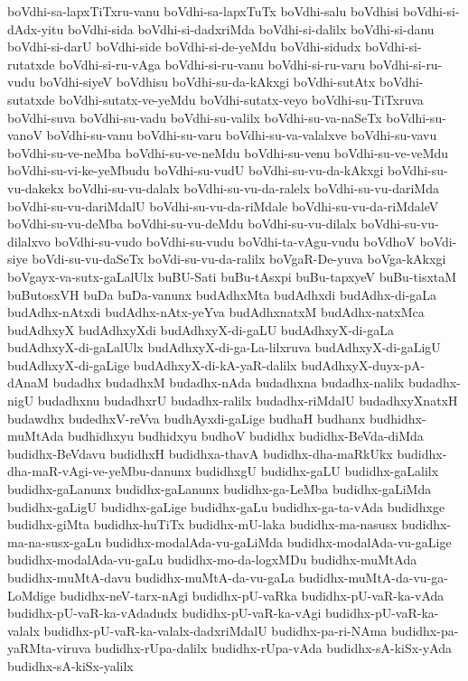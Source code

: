 {boVdhi-sa-lapxTiTxru-vanu
boVdhi-sa-lapxTuTx
boVdhi-salu
boVdhisi
boVdhi-si-dAdx-yitu
boVdhi-sida
boVdhi-si-dadxriMda
boVdhi-si-dalilx
boVdhi-si-danu
boVdhi-si-darU
boVdhi-side
boVdhi-si-de-yeMdu
boVdhi-sidudx
boVdhi-si-rutatxde
boVdhi-si-ru-vAga
boVdhi-si-ru-vanu
boVdhi-si-ru-varu
boVdhi-si-ru-vudu
boVdhi-siyeV
boVdhisu
boVdhi-su-da-kAkxgi
boVdhi-sutAtx
boVdhi-sutatxde
boVdhi-sutatx-ve-yeMdu
boVdhi-sutatx-veyo
boVdhi-su-TiTxruva
boVdhi-suva
boVdhi-su-vadu
boVdhi-su-valilx
boVdhi-su-va-naSeTx
boVdhi-su-vanoV
boVdhi-su-vanu
boVdhi-su-varu
boVdhi-su-va-valalxve
boVdhi-su-vavu
boVdhi-su-ve-neMba
boVdhi-su-ve-neMdu
boVdhi-su-venu
boVdhi-su-ve-veMdu
boVdhi-su-vi-ke-yeMbudu
boVdhi-su-vudU
boVdhi-su-vu-da-kAkxgi
boVdhi-su-vu-dakekx
boVdhi-su-vu-dalalx
boVdhi-su-vu-da-ralelx
boVdhi-su-vu-dariMda
boVdhi-su-vu-dariMdalU
boVdhi-su-vu-da-riMdale
boVdhi-su-vu-da-riMdaleV
boVdhi-su-vu-deMba
boVdhi-su-vu-deMdu
boVdhi-su-vu-dilalx
boVdhi-su-vu-dilalxvo
boVdhi-su-vudo
boVdhi-su-vudu
boVdhi-ta-vAgu-vudu
boVdhoV
boVdi-siye
boVdi-su-vu-daSeTx
boVdi-su-vu-da-ralilx
boVgaR-De-yuva
boVga-kAkxgi
boVgayx-va-sutx-gaLalUlx
buBU-Sati
buBu-tAsxpi
buBu-tapxyeV
buBu-tisxtaM
buButosxVH
buDa
buDa-vanunx
budAdhxMta
budAdhxdi
budAdhx-di-gaLa
budAdhx-nAtxdi
budAdhx-nAtx-yeYva
budAdhxnatxM
budAdhx-natxMca
budAdhxyX
budAdhxyXdi
budAdhxyX-di-gaLU
budAdhxyX-di-gaLa
budAdhxyX-di-gaLalUlx
budAdhxyX-di-ga-La-lilxruva
budAdhxyX-di-gaLigU
budAdhxyX-di-gaLige
budAdhxyX-di-kA-yaR-dalilx
budAdhxyX-duyx-pA-dAnaM
budadhx
budadhxM
budadhx-nAda
budadhxna
budadhx-nalilx
budadhx-nigU
budadhxnu
budadhxrU
budadhx-ralilx
budadhx-riMdalU
budadhxyXnatxH
budawdhx
budedhxV-reVva
budhAyxdi-gaLige
budhaH
budhanx
budhidhx-muMtAda
budhidhxyu
budhidxyu
budhoV
budidhx
budidhx-BeVda-diMda
budidhx-BeVdavu
budidhxH
budidhxa-thavA
budidhx-dha-maRkUkx
budidhx-dha-maR-vAgi-ve-yeMbu-danunx
budidhxgU
budidhx-gaLU
budidhx-gaLalilx
budidhx-gaLanunx
budidhx-gaLanunx
budidhx-ga-LeMba
budidhx-gaLiMda
budidhx-gaLigU
budidhx-gaLige
budidhx-gaLu
budidhx-ga-ta-vAda
budidhxge
budidhx-giMta
budidhx-huTiTx
budidhx-mU-laka
budidhx-ma-nasusx
budidhx-ma-na-susx-gaLu
budidhx-modalAda-vu-gaLiMda
budidhx-modalAda-vu-gaLige
budidhx-modalAda-vu-gaLu
budidhx-mo-da-logxMDu
budidhx-muMtAda
budidhx-muMtA-davu
budidhx-muMtA-da-vu-gaLa
budidhx-muMtA-da-vu-ga-LoMdige
budidhx-neV-tarx-nAgi
budidhx-pU-vaRka
budidhx-pU-vaR-ka-vAda
budidhx-pU-vaR-ka-vAdadudx
budidhx-pU-vaR-ka-vAgi
budidhx-pU-vaR-ka-valalx
budidhx-pU-vaR-ka-valalx-dadxriMdalU
budidhx-pa-ri-NAma
budidhx-pa-yaRMta-viruva
budidhx-rUpa-dalilx
budidhx-rUpa-vAda
budidhx-sA-kiSx-yAda
budidhx-sA-kiSx-yalilx
}
